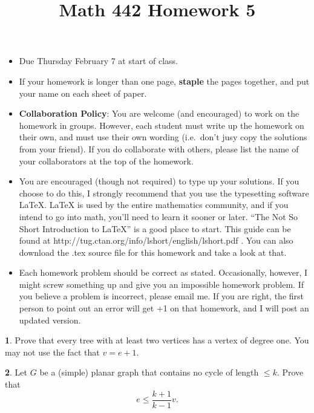 \documentclass[12pt]{article}
\title{\vspace{-2.0cm}Math 442 Homework 5}
\date{}
\theoremstyle{definition}
\newtheorem{problem}{}
\begin{document}
%
%
\maketitle
%
\vspace{-16 mm}
\begin{itemize}
\item Due Thursday February 7 at start of class.
%
\item If your homework is longer than one page, {\bf staple} the pages together, and put your name on each sheet of paper.
%
\item {\bf Collaboration Policy}: You are welcome (and encouraged) to work on the homework in groups. However, each student must write up the homework on their own, and must use their own wording (i.e.~don't jusy copy the solutions from your friend). If you do collaborate with others, please list the name of your collaborators at the top of the homework.

\item You are encouraged (though not required) to type up your solutions. If you choose to do this, I strongly recommend that you use the typesetting software LaTeX. LaTeX is used by the entire mathematics community, and if you intend to go into math, you’ll need to learn it sooner or later. ``The Not So Short Introduction to LaTeX'' is a good place to start. This guide can be found at http://tug.ctan.org/info/lshort/english/lshort.pdf . You can also download the .tex source file for this homework and take a look at that.

\item Each homework problem should be correct as stated. Occasionally, however, I might screw something up and give you an impossible homework problem. If you believe a problem is incorrect, please email me. If you are right, the first person to point out an error will get +1 on that homework, and I will post an updated version. 
\end{itemize}
\begin{problem}
Prove that every tree with at least two vertices has a vertex of degree one. You may not use the fact that $v=e+1$.
\end{problem}

\begin{problem}
Let $G$ be a (simple) planar graph that contains no cycle of length $\leq k$. Prove that 
$$
e\leq \frac{k+1}{k-1}v. 
$$
\end{problem}
\end{document}
